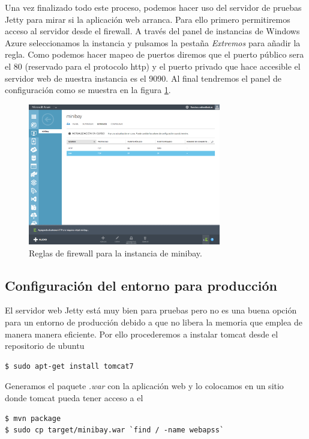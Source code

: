 \documentclass{article}
\begin{document}
Una vez finalizado todo este proceso, podemos hacer uso del servidor de pruebas Jetty para mirar si la aplicación web arranca. Para ello primero permitiremos acceso al servidor desde el firewall. A través del panel de instancias de Windows Azure seleccionamos la instancia y pulsamos la pestaña \emph{Extremos} para añadir la regla. Como podemos hacer mapeo de puertos diremos que el puerto público sera el 80 (reservado para el protocolo http) y el puerto privado que hace accesible el servidor web de nuestra instancia es el 9090. Al final tendremos el panel de configuración como se muestra en la figura \ref{fig:minibayFirewallJetty}.

\begin{figure}[h]
  \centering
    \includegraphics[width=0.75\textwidth]{img/p015.png}
  \caption{Reglas de firewall para la instancia de minibay.}
  \label{fig:minibayFirewallJetty}
\end{figure}

\subsection{Configuración del entorno para producción}

	El servidor web Jetty está muy bien para pruebas pero no es una buena opción para un entorno de producción debido a que no libera la memoria que emplea de manera manera eficiente. Por ello procederemos a instalar tomcat desde el repositorio de ubuntu
\begin{lstlisting}[style=miniBash]
$ sudo apt-get install tomcat7
\end{lstlisting}	

	Generamos el paquete \emph{.war} con la aplicación web y lo colocamos en un sitio donde tomcat pueda tener acceso a el
\begin{lstlisting}[style=miniBash]
$ mvn package
$ sudo cp target/minibay.war `find / -name webapss`
\end{lstlisting}	
\end{document}
